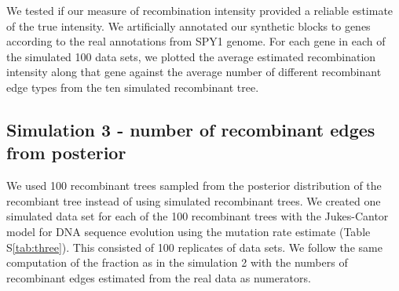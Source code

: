 \documentclass[10pt]{article}
\begin{document}
We tested if our measure of recombination intensity provided a reliable estimate
of the true intensity. We artificially annotated our synthetic blocks to genes
according to the real annotations from SPY1 genome.  For each gene in each of
the simulated 100 data sets, we plotted the average estimated recombination
intensity along that gene against the average number of different recombinant
edge types from the ten simulated recombinant tree. 




\subsection*{Simulation 3 - number of recombinant edges from posterior}

We used 100 recombinant trees sampled from the posterior distribution
of the recombiant tree instead of using simulated recombinant trees.
We created one simulated data set for each of the 100 recombinant trees with
the Jukes-Cantor model for DNA sequence evolution 
using the mutation rate estimate (Table S\ref{tab:three}).
This consisted of 100 replicates of data sets.  
We follow the same computation of the fraction as in the simulation 2 with 
the numbers of recombinant edges estimated from the real data
as numerators. 

\end{document}
